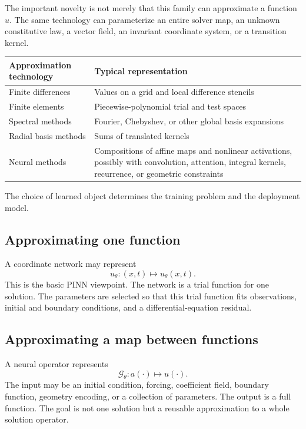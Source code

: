 \documentclass[11pt]{article}
\newcommand{\G}{\mathcal{G}}
\begin{document}
The important novelty is not merely that this family can approximate a function \(u\). The same technology can parameterize an entire solver map, an unknown constitutive law, a vector field, an invariant coordinate system, or a transition kernel.

\begin{center}
\begin{tabularx}{\textwidth}{@{}P{0.23\textwidth}Y@{}}
\toprule
\textbf{Approximation technology} & \textbf{Typical representation} \\
\midrule
Finite differences & Values on a grid and local difference stencils \\
Finite elements & Piecewise-polynomial trial and test spaces \\
Spectral methods & Fourier, Chebyshev, or other global basis expansions \\
Radial basis methods & Sums of translated kernels \\
Neural methods & Compositions of affine maps and nonlinear activations, possibly with convolution, attention, integral kernels, recurrence, or geometric constraints \\
\bottomrule
\end{tabularx}
\end{center}

The choice of learned object determines the training problem and the deployment model.

\subsection{Approximating one function}

A coordinate network may represent
\[
 u_\theta:(x,t)\longmapsto u_\theta(x,t).
\]
This is the basic PINN viewpoint. The network is a trial function for one solution. The parameters are selected so that this trial function fits observations, initial and boundary conditions, and a differential-equation residual.

\subsection{Approximating a map between functions}

A neural operator represents
\[
 \G_\theta:a(\cdot)\longmapsto u(\cdot).
\]
The input may be an initial condition, forcing, coefficient field, boundary function, geometry encoding, or a collection of parameters. The output is a full function. The goal is not one solution but a reusable approximation to a whole solution operator.
\end{document}

